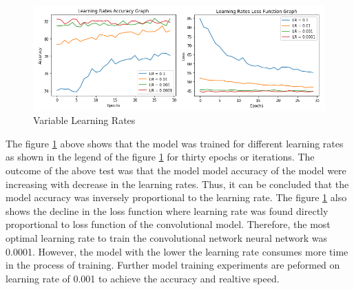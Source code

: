 \begin{figure}[!htp]
    \centering
    \includegraphics[width=15cm]{Images/lr.png}
    \caption{Variable Learning Rates}
    \label{fig:lrates}
\end{figure}

The figure \ref{fig:lrates} above shows that the model was trained for different learning rates as shown
in the legend of the figure \ref{fig:lrates} for thirty epochs or iterations. The outcome of the above test 
was that the model model accuracy of the model were increasing with decrease in the learning rates. Thus, it 
can be concluded that the model accuracy was  inversely proportional to the learning rate. The figure \ref{fig:lrates} also shows the 
decline in the loss function where learning rate was found directly proportional to loss function of the 
convolutional model. Therefore, the most optimal learning rate to train the convolutional network 
neural network was 0.0001. However, the model with the lower the learning rate consumes more time in the 
process of training. Further model training experiments are peformed on 
learning rate of 0.001 to achieve the accuracy and realtive speed.